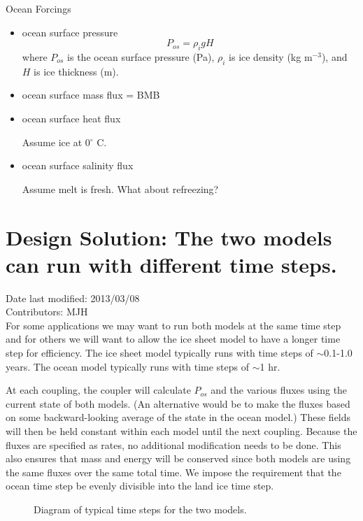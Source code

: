 \documentclass[11pt]{report}
\begin{document}
Ocean Forcings
\begin{itemize}
\item
ocean surface pressure
\begin{equation}
    \label{pressure}
	P_{os} = \rho_i g H
\end{equation}
where $P_{os}$ is the ocean surface pressure (Pa), $\rho_i$ is ice density (kg m$^{-3}$), and $H$ is ice thickness (m). 
\item 
ocean surface mass flux = BMB

\item
ocean surface heat flux

Assume ice at 0$^{\circ}$ C.

\item
ocean surface salinity flux

Assume melt is fresh.  What about refreezing?

\end{itemize}


\section{Design Solution: The two models can run with different time steps.}
Date last modified: 2013/03/08 \\
Contributors: MJH \\

For some applications we may want to run both models at the same time step and for others we will want to allow the ice sheet model to have a longer time step for efficiency.  The ice sheet model typically runs with time steps of $\sim$0.1-1.0 years.  The ocean model typically runs with time steps of $\sim$1 hr.

At each coupling, the coupler will calculate $P_{os}$ and the various fluxes using the current state of both models.  (An alternative would be to make the fluxes based on some backward-looking average of the state in the ocean model.)  These fields will then be held constant within each model until the next coupling.  Because the fluxes are specified as rates, no additional modification needs to be done.  This also ensures that mass and energy will be conserved since both models are using the same fluxes over the same total time.  We impose the requirement that the ocean time step be evenly divisible into the land ice time step.


\begin{figure}[hbt]
  \caption{Diagram of typical time steps for the two models.}
  \label{coupler-time}
\end{figure} 
\end{document}
